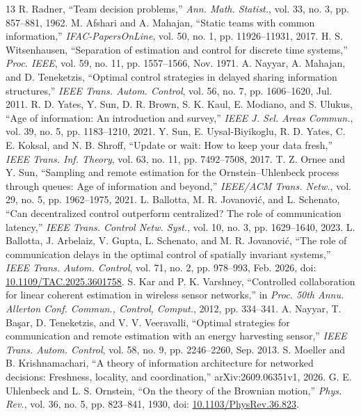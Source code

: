 \documentclass[letterpaper,10pt,conference]{ieeeconf}
\begin{document}
\begin{thebibliography}{13}
 R. Radner, ``Team decision problems,'' \emph{Ann. Math. Statist.}, vol. 33, no. 3, pp. 857--881, 1962.
 M. Afshari and A. Mahajan, ``Static teams with common information,'' \emph{IFAC-PapersOnLine}, vol. 50, no. 1, pp. 11926--11931, 2017.
 H. S. Witsenhausen, ``Separation of estimation and control for discrete time systems,'' \emph{Proc. IEEE}, vol. 59, no. 11, pp. 1557--1566, Nov. 1971.
 A. Nayyar, A. Mahajan, and D. Teneketzis, ``Optimal control strategies in delayed sharing information structures,'' \emph{IEEE Trans. Autom. Control}, vol. 56, no. 7, pp. 1606--1620, Jul. 2011.
 R. D. Yates, Y. Sun, D. R. Brown, S. K. Kaul, E. Modiano, and S. Ulukus, ``Age of information: An introduction and survey,'' \emph{IEEE J. Sel. Areas Commun.}, vol. 39, no. 5, pp. 1183--1210, 2021.
 Y. Sun, E. Uysal-Biyikoglu, R. D. Yates, C. E. Koksal, and N. B. Shroff, ``Update or wait: How to keep your data fresh,'' \emph{IEEE Trans. Inf. Theory}, vol. 63, no. 11, pp. 7492--7508, 2017.
 T. Z. Ornee and Y. Sun, ``Sampling and remote estimation for the Ornstein--Uhlenbeck process through queues: Age of information and beyond,'' \emph{IEEE/ACM Trans. Netw.}, vol. 29, no. 5, pp. 1962--1975, 2021.
 L. Ballotta, M. R. Jovanovi{\'c}, and L. Schenato, ``Can decentralized control outperform centralized? The role of communication latency,'' \emph{IEEE Trans. Control Netw. Syst.}, vol. 10, no. 3, pp. 1629--1640, 2023.
 L. Ballotta, J. Arbelaiz, V. Gupta, L. Schenato, and M. R. Jovanovi{\'c}, ``The role of communication delays in the optimal control of spatially invariant systems,'' \emph{IEEE Trans. Autom. Control}, vol. 71, no. 2, pp. 978--993, Feb. 2026, doi: \href{https://doi.org/10.1109/TAC.2025.3601758}{10.1109/TAC.2025.3601758}.
 S. Kar and P. K. Varshney, ``Controlled collaboration for linear coherent estimation in wireless sensor networks,'' in \emph{Proc. 50th Annu. Allerton Conf. Commun., Control, Comput.}, 2012, pp. 334--341.
 A. Nayyar, T. Ba\c{s}ar, D. Teneketzis, and V. V. Veeravalli, ``Optimal strategies for communication and remote estimation with an energy harvesting sensor,'' \emph{IEEE Trans. Autom. Control}, vol. 58, no. 9, pp. 2246--2260, Sep. 2013.
 S. Moeller and B. Krishnamachari, ``A theory of information architecture for networked decisions: Freshness, locality, and coordination,'' arXiv:2609.06351v1, 2026.
 G. E. Uhlenbeck and L. S. Ornstein, ``On the theory of the Brownian motion,'' \emph{Phys. Rev.}, vol. 36, no. 5, pp. 823--841, 1930, doi: \href{https://doi.org/10.1103/PhysRev.36.823}{10.1103/PhysRev.36.823}.
\end{thebibliography}
\end{document}
